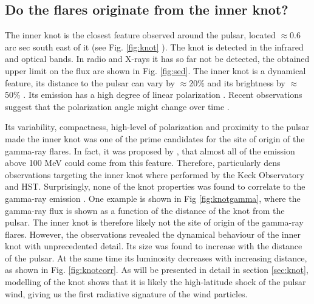 \subsection{Do the flares originate from the inner knot?} 

The inner knot is the closest feature observed around the pulsar, located $\approx$0.6 arc sec south east of it (see Fig. \ref{fig:knot} ). The knot is detected in the infrared and optical bands. In radio and X-rays it has so far not be detected, the obtained upper limit on the flux are shown in Fig. \ref{fig:sed}. The inner knot is a dynamical feature, its distance to the pulsar can vary by $\approx$20\%  and its brightness by $\approx$50\% \cite{Sandberg2009}.  Its emission has a high degree of linear polarization \cite{Moran_2013}. Recent observations suggest that the polarization angle might change over time \cite{Moran_2015} . 

Its variability, compactness, high-level of polarization and proximity to the pulsar made the inner knot was one of the prime candidates for the site of origin of the gamma-ray flares.  In fact, it was proposed by \citet{komissarov2011}, that almost all of the emission above 100 MeV could come from this feature. Therefore, particularly dens observations targeting the inner knot where performed by the Keck Observatory and HST. Surprisingly, none of the knot properties was found to correlate to the gamma-ray emission \cite{rudy2015}. One example is shown in Fig \ref{fig:knotgamma},  where the gamma-ray flux is shown as a function of the distance of the knot from the pulsar. The inner knot is therefore likely not the site of origin of the gamma-ray flares. However, the observations revealed the dynamical behaviour of the inner knot with unprecedented detail. Its size was found to increase with the distance of the pulsar. At the same time its luminosity decreases with increasing distance, as shown in Fig. \ref{fig:knotcorr}.  As will be presented in detail in section \ref{sec:knot}, modelling of the knot shows that it is likely the high-latitude shock of the pulsar wind, giving us the first radiative signature of the wind particles.